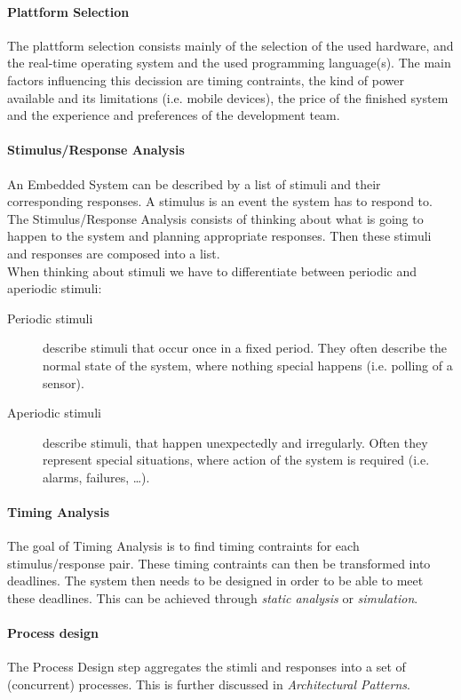 \documentclass[10pt,a4paper,titlepage,draft]{report} %
\begin{document}
\paragraph{Plattform Selection}
The plattform selection consists mainly of the selection of the used hardware, and the real-time operating system and the used programming language(s).
The main factors influencing this decission are timing contraints, the kind of power available and its limitations (i.e. mobile devices), the price of the finished system and the experience and preferences of the development team.

\paragraph{Stimulus/Response Analysis}
An Embedded System can be described by a list of stimuli and their corresponding responses.
A stimulus is an event the system has to respond to.
The Stimulus/Response Analysis consists of thinking about what is going to happen to the system and planning appropriate responses.
Then these stimuli and responses are composed into a list. \\
When thinking about stimuli we have to differentiate between periodic and aperiodic stimuli:
\begin{description}
	\item[Periodic stimuli] describe stimuli that occur once in a fixed period.
	They often describe the normal state of the system, where nothing special happens (i.e. polling of a sensor).
	\item[Aperiodic stimuli] describe stimuli, that happen unexpectedly and irregularly.
	Often they represent special situations, where action of the system is required (i.e. alarms, failures, \dots).
\end{description}

\paragraph{Timing Analysis}
The goal of Timing Analysis is to find timing contraints for each stimulus/response pair.
These timing contraints can then be transformed into deadlines.
The system then needs to be designed in order to be able to meet these deadlines.
This can be achieved through \emph{static analysis} or \emph{simulation}.

\paragraph{Process design}
The Process Design step aggregates the stimli and responses into a set of (concurrent) processes.
This is further discussed in \emph{Architectural Patterns}.
\end{document}
